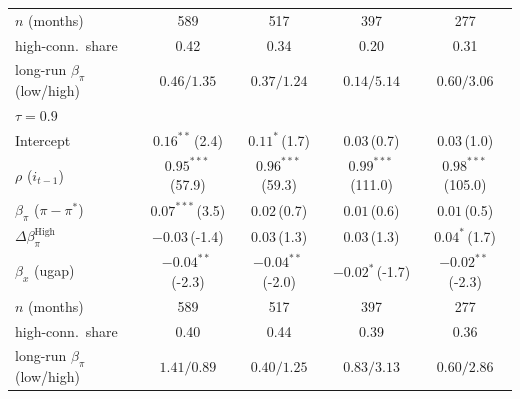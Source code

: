 \begin{tabular}{lcccc}
\addlinespace
$n$ (months) & 589 & 517 & 397 & 277 \\
high-conn.\ share & 0.42 & 0.34 & 0.20 & 0.31 \\
long-run $\beta_\pi$ (low/high) & $0.46/1.35$ & $0.37/1.24$ & $0.14/5.14$ & $0.60/3.06$ \\
\midrule
\multicolumn{5}{l}{\textit{$\tau=0.9$}} \\
Intercept & $0.16^{**}$\,{\scriptsize(2.4)} & $0.11^{*}$\,{\scriptsize(1.7)} & $0.03$\,{\scriptsize(0.7)} & $0.03$\,{\scriptsize(1.0)} \\
$\rho$ ($i_{t-1}$) & $0.95^{***}$\,{\scriptsize(57.9)} & $0.96^{***}$\,{\scriptsize(59.3)} & $0.99^{***}$\,{\scriptsize(111.0)} & $0.98^{***}$\,{\scriptsize(105.0)} \\
$\beta_\pi$ ($\pi-\pi^*$) & $0.07^{***}$\,{\scriptsize(3.5)} & $0.02$\,{\scriptsize(0.7)} & $0.01$\,{\scriptsize(0.6)} & $0.01$\,{\scriptsize(0.5)} \\
$\Delta\beta_\pi^{\text{High}}$ & $-0.03$\,{\scriptsize(-1.4)} & $0.03$\,{\scriptsize(1.3)} & $0.03$\,{\scriptsize(1.3)} & $0.04^{*}$\,{\scriptsize(1.7)} \\
$\beta_x$ (ugap) & $-0.04^{**}$\,{\scriptsize(-2.3)} & $-0.04^{**}$\,{\scriptsize(-2.0)} & $-0.02^{*}$\,{\scriptsize(-1.7)} & $-0.02^{**}$\,{\scriptsize(-2.3)} \\
\addlinespace
$n$ (months) & 589 & 517 & 397 & 277 \\
high-conn.\ share & 0.40 & 0.44 & 0.39 & 0.36 \\
long-run $\beta_\pi$ (low/high) & $1.41/0.89$ & $0.40/1.25$ & $0.83/3.13$ & $0.60/2.86$ \\
\bottomrule
\end{tabular}
